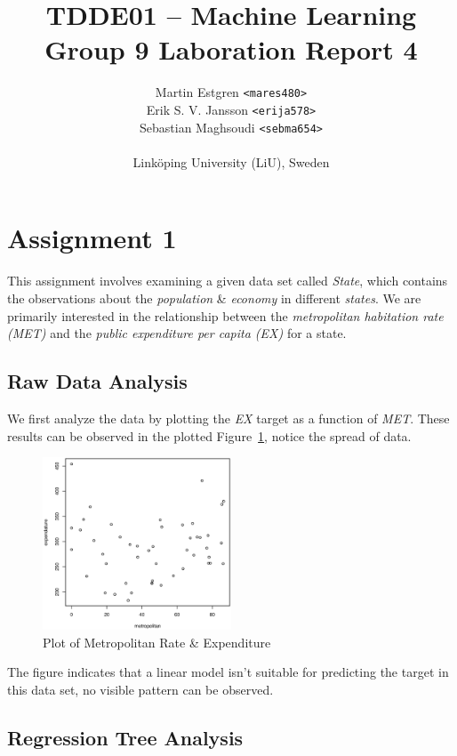\documentclass[a4paper, twocolumn]{article}
\title{TDDE01 -- Machine Learning \\
       Group 9 Laboration Report 4}
\author{{Martin Estgren \texttt{<mares480>}} \\
        {Erik S. V. Jansson \texttt{<erija578>}} \\
        {Sebastian Maghsoudi \texttt{<sebma654>}} \\~\\
        {Linköping University (LiU), Sweden}}
\begin{document}
    \maketitle %

    \section*{Assignment 1}

        This assignment involves examining a given data set called \emph{State}, which contains the observations about the \emph{population} \& \emph{economy} in different \emph{states}. We are primarily interested in the relationship between the \emph{metropolitan habitation rate (MET)} and the \emph{public expenditure per capita (EX)} for a state.

    \subsection*{Raw Data Analysis}

        We first analyze the data by plotting the \emph{EX} target as a function of \emph{MET}. These results can be observed in the plotted Figure~\ref{fig:state}, notice the spread of data.

        \begin{figure}[h!]
            \centering
            \caption{Plot of Metropolitan Rate \& Expenditure}
            \label{fig:state}
            \includegraphics[width=0.5\textwidth]{share/A1_data.eps}
        \end{figure}

        The figure indicates that a linear model isn't suitable for predicting the target in this data set, no visible pattern can be observed.

    \subsection*{Regression Tree Analysis}
\end{document}
